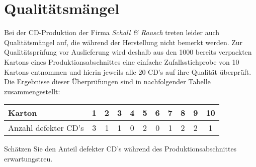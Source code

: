 \documentclass{article}
\begin{document}
\section{Qualitätsmängel}
Bei der CD-Produktion der Firma \emph{Schall \& Rausch} treten leider auch Qualitätsmängel auf,
die während der Herstellung nicht bemerkt werden.
Zur Qualitätsprüfung vor Auslieferung wird deshalb aus den 1000 bereits verpackten Kartons eines Produktionsabschnittes
eine einfache Zufallsstichprobe  von 10 Kartons entnommen und hierin jeweils alle 20 CD's auf ihre Qualität überprüft.
Die Ergebnisse dieser Überprüfungen sind in nachfolgender Tabelle zusammengestellt:
\begin{center}
	\begin{tabular}{|l|cccccccccc|} \hline
		Karton & 1 & 2 & 3 & 4 & 5 & 6 & 7 & 8 & 9 & 10 \\ \hline
		Anzahl defekter CD's & 3 & 1 & 1 & 0 & 2 & 0 & 1 & 2 & 2 & 1\\ \hline
	\end{tabular}
\end{center}
Schätzen Sie den Anteil defekter CD's während des Produktionsabschnittes erwartungstreu.
\begin{solution}

\end{solution}
\end{document}
